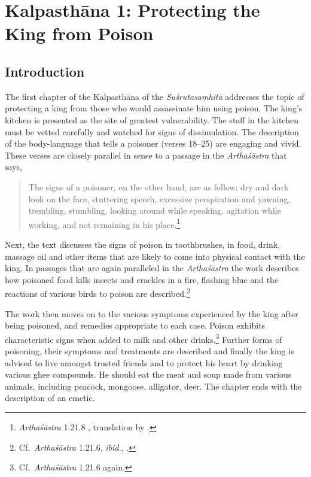 \chapter{Kalpasthāna 1: Protecting the King from Poison}

\section{Introduction}

The first chapter of the Kalpasthāna of the \emph{Suśrutasaṃhitā} addresses the 
topic of protecting a king from those who would assassinate him using poison.  
The king's kitchen is presented as the site of greatest vulnerability.  The staff in 
the kitchen must be vetted carefully and watched for signs of dissimulation.  The 
description of the body-language that tells a poisoner (verses 18--25) are 
engaging and vivid.  These verses are closely parallel in sense to a passage in the 
\emph{Arthaśāstra} that says, 
\begin{quote}
    The signs of a poisoner, on the other hand, are as follow: dry and
    dark look on the face, stuttering speech, excessive perspiration and yawning, 
    trembling, stumbling, looking around while speaking, agitation while
    working, and not remaining in his place.\footnote{\emph{Arthaśāstra} 1.21.8 
    \citep[1, 30]{kang-1969}, 
    translation by \citet[97]{oliv-2013}.} 
\end{quote}

Next, the text discusses the signs of poison in toothbrushes, in food, drink,
massage oil and other items that are likely to come into physical contact with the
king.  In passages that are again paralleled in the \emph{Arthaśāstra} the work
describes how poisoned food kills insects and crackles in a fire, flashing blue
and  the reactions of various birds to poison are described.\footnote{Cf.\
\emph{Arthaśāstra} 1.21.6, \emph{ibid.}, \citet[96]{oliv-2013}.}


The work then moves on to the various symptoms experienced by the king after 
being poisoned, and remedies appropriate to each case.  Poison exhibits 
characteristic signs when added to milk and other drinks.\footnote{Cf.\
\emph{Arthaśāstra} 1.21.6 again.} Further forms of poisoning, their symptoms 
and treatments are described  and finally the king is advised to live amongst 
trusted friends and to protect his heart by drinking various ghee compounds.  He 
should eat the meat and soup made from various animals, including peacock, 
mongoose, alligator, deer.  The chapter ends with the description of an emetic.

